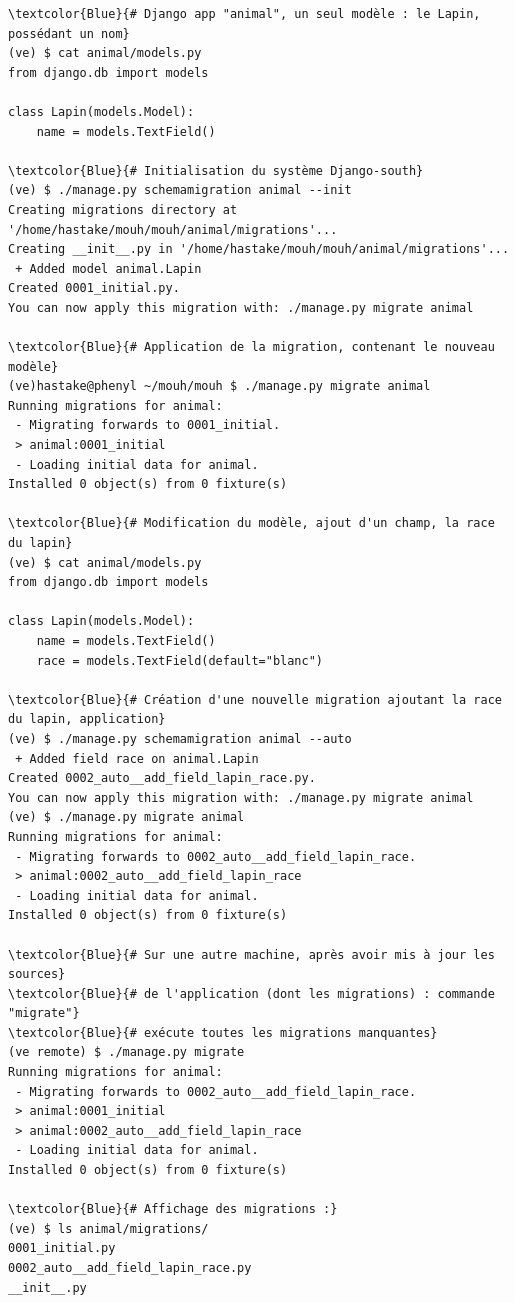 \documentclass[a4paper,12pt]{article}
\begin{document}
\begin{Verbatim}
\textcolor{Blue}{# Django app "animal", un seul modèle : le Lapin, possédant un nom}
(ve) $ cat animal/models.py
from django.db import models

class Lapin(models.Model):
    name = models.TextField()

\textcolor{Blue}{# Initialisation du système Django-south}
(ve) $ ./manage.py schemamigration animal --init
Creating migrations directory at '/home/hastake/mouh/mouh/animal/migrations'...
Creating __init__.py in '/home/hastake/mouh/mouh/animal/migrations'...
 + Added model animal.Lapin
Created 0001_initial.py.
You can now apply this migration with: ./manage.py migrate animal

\textcolor{Blue}{# Application de la migration, contenant le nouveau modèle}
(ve)hastake@phenyl ~/mouh/mouh $ ./manage.py migrate animal
Running migrations for animal:
 - Migrating forwards to 0001_initial.
 > animal:0001_initial
 - Loading initial data for animal.
Installed 0 object(s) from 0 fixture(s)

\textcolor{Blue}{# Modification du modèle, ajout d'un champ, la race du lapin}
(ve) $ cat animal/models.py
from django.db import models

class Lapin(models.Model):
    name = models.TextField()
    race = models.TextField(default="blanc")

\textcolor{Blue}{# Création d'une nouvelle migration ajoutant la race du lapin, application}
(ve) $ ./manage.py schemamigration animal --auto
 + Added field race on animal.Lapin
Created 0002_auto__add_field_lapin_race.py.
You can now apply this migration with: ./manage.py migrate animal
(ve) $ ./manage.py migrate animal
Running migrations for animal:
 - Migrating forwards to 0002_auto__add_field_lapin_race.
 > animal:0002_auto__add_field_lapin_race
 - Loading initial data for animal.
Installed 0 object(s) from 0 fixture(s)

\textcolor{Blue}{# Sur une autre machine, après avoir mis à jour les sources}
\textcolor{Blue}{# de l'application (dont les migrations) : commande "migrate"}
\textcolor{Blue}{# exécute toutes les migrations manquantes}
(ve remote) $ ./manage.py migrate
Running migrations for animal:
 - Migrating forwards to 0002_auto__add_field_lapin_race.
 > animal:0001_initial
 > animal:0002_auto__add_field_lapin_race
 - Loading initial data for animal.
Installed 0 object(s) from 0 fixture(s)

\textcolor{Blue}{# Affichage des migrations :}
(ve) $ ls animal/migrations/
0001_initial.py
0002_auto__add_field_lapin_race.py
__init__.py
\end{Verbatim}
\end{document}

